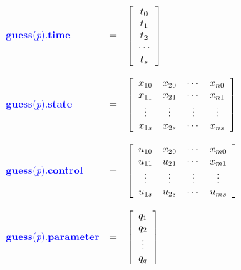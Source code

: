 \documentclass[10pt,final]{report}
\newcommand{\bfblue}[1]{\textcolor{blue}{\bf #1}}
\begin{document}
\begin{displaymath}
  \begin{array}{lcl}
    \bfblue{guess(\textit{p}).time} & = &
    \left[\begin{array}{c} t_0 \\ t_1 \\ t_2 \\ \cdots \\
        t_{s} \end{array} \right] \\ \\
    \bfblue{guess(\textit{p}).state} & = &
    \left[\begin{array}{cccc} x_{10} & x_{20} & \cdots & x_{n0} \\
        x_{11} & x_{21} & \cdots & x_{n1} \\
        \vdots & \vdots & \vdots & \vdots \\
        x_{1s} & x_{2s} & \cdots & x_{ns}
        \end{array} \right] \\ \\
    \bfblue{guess(\textit{p}).control} & = &
    \left[\begin{array}{cccc} u_{10} & x_{20} & \cdots & x_{m0} \\
        u_{11} & u_{21} & \cdots & x_{m1} \\
        \vdots & \vdots & \vdots & \vdots \\
        u_{1s} & u_{2s} & \cdots & u_{ms}
        \end{array}
      \right] \\ \\
    \bfblue{guess(\textit{p}).parameter} & = &
    \left[\begin{array}{c} q_1 \\ q_2 \\ \vdots \\ q_q \end{array} \right]
  \end{array}
\end{displaymath}
\end{document}
